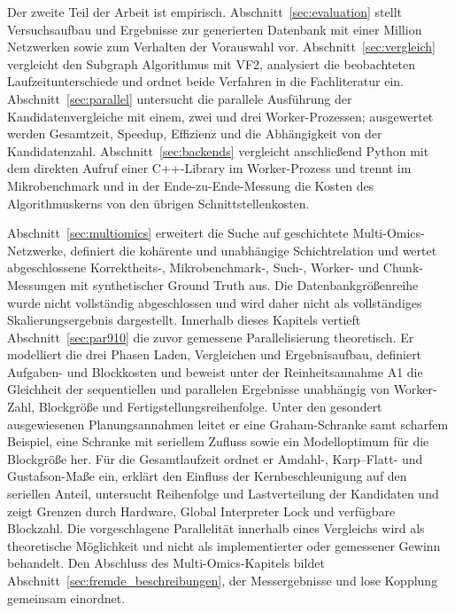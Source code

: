 \documentclass[a4paper,12pt, twoside]{report}
\theoremstyle{definition}
\begin{document}
Der zweite Teil der Arbeit ist empirisch. Abschnitt~\ref{sec:evaluation} stellt Versuchsaufbau und Ergebnisse zur generierten Datenbank mit einer Million Netzwerken sowie zum Verhalten der Vorauswahl vor. Abschnitt~\ref{sec:vergleich} vergleicht den Subgraph Algorithmus mit VF2, analysiert die beobachteten Laufzeitunterschiede und ordnet beide Verfahren in die Fachliteratur ein. Abschnitt~\ref{sec:parallel} untersucht die parallele Ausführung der Kandidatenvergleiche mit einem, zwei und drei Worker-Prozessen; ausgewertet werden Gesamtzeit, Speedup, Effizienz und die Abhängigkeit von der Kandidatenzahl. Abschnitt~\ref{sec:backends} vergleicht anschließend Python mit dem direkten Aufruf einer C++-Library im Worker-Prozess und trennt im Mikrobenchmark und in der Ende-zu-Ende-Messung die Kosten des Algorithmuskerns von den übrigen Schnittstellenkosten.

Abschnitt~\ref{sec:multiomics} erweitert die Suche auf geschichtete Multi-Omics-Netzwerke, definiert die kohärente und unabhängige Schichtrelation und wertet abgeschlossene Korrektheits-, Mikrobenchmark-, Such-, Worker- und Chunk-Messungen mit synthetischer Ground Truth aus. Die Datenbankgrößenreihe wurde nicht vollständig abgeschlossen und wird daher nicht als vollständiges Skalierungsergebnis dargestellt. Innerhalb dieses Kapitels vertieft Abschnitt~\ref{sec:par910} die zuvor gemessene Parallelisierung theoretisch. Er modelliert die drei Phasen Laden, Vergleichen und Ergebnisaufbau, definiert Aufgaben- und Blockkosten und beweist unter der Reinheitsannahme A1 die Gleichheit der sequentiellen und parallelen Ergebnisse unabhängig von Worker-Zahl, Blockgröße und Fertigstellungsreihenfolge. Unter den gesondert ausgewiesenen Planungsannahmen leitet er eine Graham-Schranke samt scharfem Beispiel, eine Schranke mit seriellem Zufluss sowie ein Modelloptimum für die Blockgröße her. Für die Gesamtlaufzeit ordnet er Amdahl-, Karp--Flatt- und Gustafson-Maße ein, erklärt den Einfluss der Kernbeschleunigung auf den seriellen Anteil, untersucht Reihenfolge und Lastverteilung der Kandidaten und zeigt Grenzen durch Hardware, Global Interpreter Lock und verfügbare Blockzahl. Die vorgeschlagene Parallelität innerhalb eines Vergleichs wird als theoretische Möglichkeit und nicht als implementierter oder gemessener Gewinn behandelt. Den Abschluss des Multi-Omics-Kapitels bildet Abschnitt~\ref{sec:fremde_beschreibungen}, der Messergebnisse und lose Kopplung gemeinsam einordnet.
\end{document}
